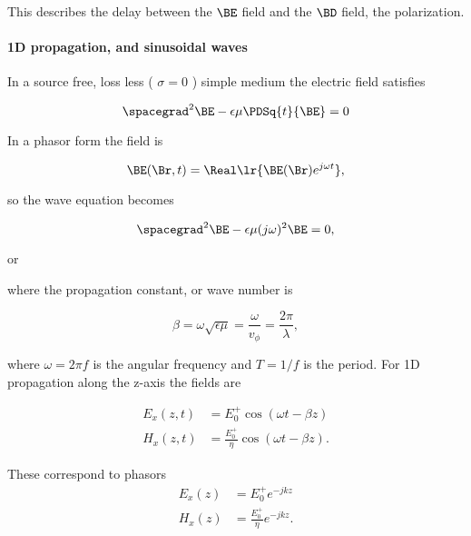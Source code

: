 This describes the delay between the \( \BE \) field and the \( \BD \) field, the polarization.

\paragraph{1D propagation, and sinusoidal waves}

In a source free, loss less ( \( \sigma = 0 \) ) simple medium the electric field satisfies

\begin{equation}\label{eqn:uwavesLecture2:900}
\spacegrad^2 \BE - \epsilon \mu \PDSq{t}{\BE} = 0
\end{equation}

In a phasor form the field is

\begin{equation}\label{eqn:uwavesLecture2:920}
\BE(\Br, t) = \Real\lr{ \BE(\Br) e^{j \omega t} },
\end{equation}

so the wave equation becomes

\begin{equation}\label{eqn:uwavesLecture2:940}
\spacegrad^2 \BE - \epsilon \mu (j\omega)^2 \BE = 0,
\end{equation}

or

where the propagation constant, or wave number is

\begin{equation}\label{eqn:uwavesLecture2:980}
\beta = \omega \sqrt{\epsilon \mu} = \frac{\omega}{v_\phi} = \frac{2 \pi}{\lambda},
\end{equation}

where \( \omega = 2 \pi f \) is the angular frequency and \( T = 1/f \) is the period.  For 1D propagation along the z-axis the fields are

\begin{equation}\label{eqn:uwavesLecture2:1000}
\begin{aligned}
E_x(z, t) &= E_0^{+} \cos(\omega t - \beta z) \\
H_x(z, t) &= \frac{E_0^{+}}{\eta} \cos(\omega t - \beta z).
\end{aligned}
\end{equation}

These correspond to phasors
\begin{equation}\label{eqn:uwavesLecture2:1020}
\begin{aligned}
E_x(z) &= E_0^{+} e^{-j k z } \\
H_x(z) &= \frac{E_0^{+}}{\eta} e^{-j k z }.
\end{aligned}
\end{equation}

